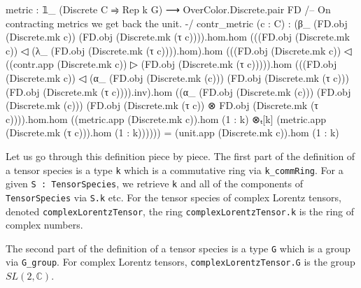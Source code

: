 \documentclass[a4paper, 11pt]{article}
\DeclareRobustCommand{\myinline}{\lstinline}
\begin{document}
\begin{codeLong}
  metric : 𝟙_ (Discrete C ⥤ Rep k G) ⟶ OverColor.Discrete.pair FD
  /-- On contracting metrics we get back the unit. -/
  contr_metric (c : C) :
    (β_ (FD.obj (Discrete.mk c)) (FD.obj (Discrete.mk (τ c)))).hom.hom
    (((FD.obj (Discrete.mk c)) ◁ (λ_ (FD.obj (Discrete.mk (τ c)))).hom).hom
    (((FD.obj (Discrete.mk c)) ◁ ((contr.app (Discrete.mk c)) ▷
    (FD.obj (Discrete.mk (τ c))))).hom
    (((FD.obj (Discrete.mk c)) ◁ (α_ (FD.obj (Discrete.mk (c)))
      (FD.obj (Discrete.mk (τ c))) (FD.obj (Discrete.mk (τ c)))).inv).hom
    ((α_ (FD.obj (Discrete.mk (c))) (FD.obj (Discrete.mk (c)))
      (FD.obj (Discrete.mk (τ c)) ⊗ FD.obj (Discrete.mk (τ c)))).hom.hom
    ((metric.app (Discrete.mk c)).hom (1 : k) ⊗ₜ[k]
      (metric.app (Discrete.mk (τ c))).hom (1 : k))))))
    = (unit.app (Discrete.mk c)).hom (1 : k)
\end{codeLong}

Let us go through this definition piece by piece.
The first part of the definition of a tensor species is a type \myinline|k| 
which is a commutative ring via \myinline|k_commRing|. 
For a given \myinline|S : TensorSpecies|, we retrieve \myinline|k| and all of the 
components of \myinline|TensorSpecies| via \myinline|S.k| etc. 
For the tensor species of complex Lorentz tensors, denoted 
\myinline|complexLorentzTensor|, the ring \myinline|complexLorentzTensor.k| is the ring of complex numbers.

The second part of the definition of a tensor species is a type \myinline|G| 
which is a group via \myinline|G_group|. For complex Lorentz tensors, 
\myinline|complexLorentzTensor.G| is the group $SL(2, \mathbb{C})$.
\end{document}
